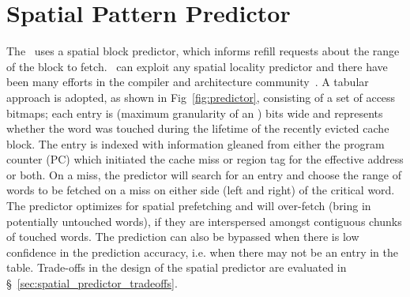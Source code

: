 \section{Spatial Pattern Predictor}
\label{sec:spatial_pattern_predictor}

The \AC\ uses a spatial block predictor, which  informs refill requests about the range of the block to fetch. \AC\ can exploit any spatial locality predictor and there have been many efforts in the compiler and architecture community~\cite{Chilimbi-Hill-pldi-1999, kumar-isca-1998, pujara-hpca-2006,chen-hpca-2004}. A tabular approach is adopted, as shown in Fig~\ref{fig:predictor}, consisting of a set of access bitmaps; each entry is  (maximum granularity of an \AB{}) bits wide and represents whether the word was touched during the lifetime of the recently evicted cache block. The entry is indexed with information gleaned from either the program counter (PC) which initiated the cache miss or region tag for the effective address or both. On a miss, the predictor will search for an entry  and choose the range of words to be fetched on a miss on either side (left and right) of the critical word. The predictor optimizes for spatial prefetching and will over-fetch (bring in potentially untouched words), if they are interspersed amongst contiguous chunks of touched words. The prediction can also be bypassed when there is low confidence in the prediction accuracy, i.e. when there may not be an entry in the table. Trade-offs in the design of the spatial predictor are evaluated in \S~\ref{sec:spatial_predictor_tradeoffs}.


